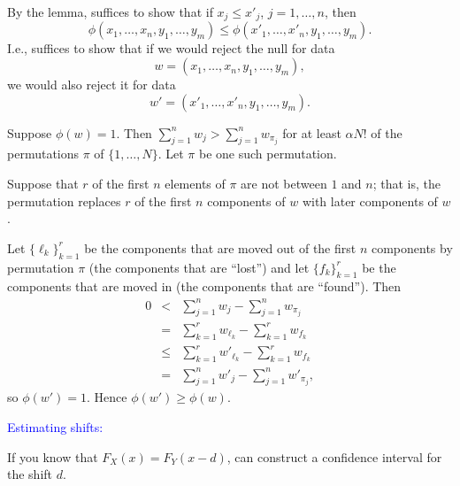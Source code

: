 \documentclass[landscape]{slides}
\newcommand{\beq}{\begin{equation}}
\newcommand{\eeq}{\end{equation}}
\begin{document}
\begin{slide}
\begin{slide}
\end{slide}


\begin{slide}

By the lemma, suffices to show that if $x_j \le x'_j$, $j = 1, \ldots, n$, then
\beq
    \phi(x_1, \ldots, x_n, y_1, \ldots, y_m) \le \phi(x'_1, \ldots, x'_n, y_1, \ldots, y_m).
\eeq
I.e., suffices to show that if we would reject the null for data 
\beq
   w = (x_1, \ldots, x_n, y_1, \ldots, y_m), 
\eeq
we would also reject it for data
\beq
   w' =  (x'_1, \ldots, x'_n, y_1, \ldots, y_m).
\eeq

Suppose $\phi(w) = 1$.
Then $\sum_{j=1}^n w_j > \sum_{j=1}^n w_{\pi_j}$ for
at least $\alpha N!$ of the permutations $\pi$ of $\{ 1, \ldots, N\}$.
Let $\pi$ be one such permutation.

\end{slide}

\begin{slide}
Suppose that $r$ of the first $n$ elements of $\pi$ are not between
$1$ and $n$; that is, the permutation replaces $r$ of the first
$n$ components of $w$ with later components of $w$.

Let $\{ \ell_k \}_{k=1}^r$ be the components that are moved out of
the first $n$ components by permutation $\pi$ (the components that
are ``lost'') and let 
$\{ f_k \}_{k=1}^r$ be the components that are moved in (the components 
that are ``found'').
Then
\begin{eqnarray*}
   0  & <  & \sum_{j=1}^n w_j - \sum_{j=1}^n w_{\pi_j} \\
       & =  &  \sum_{k=1}^r w_{\ell_k} - \sum_{k=1}^r w_{f_k} \\
       & \le & \sum_{k=1}^r w'_{\ell_k} - \sum_{k=1}^r w_{f_k} \\
       & = & \sum_{j=1}^n w'_j - \sum_{j=1}^n w'_{\pi_j},
\end{eqnarray*}
so $\phi(w') = 1$.
Hence $\phi(w') \ge \phi(w)$.

\end{slide}

\begin{slide}
{\textcolor{blue}{Estimating shifts:}}

If you know that $F_X(x) = F_Y(x-d)$, can construct a confidence interval for the
shift $d$.


\end{slide}
\end{slide}
\end{document}
